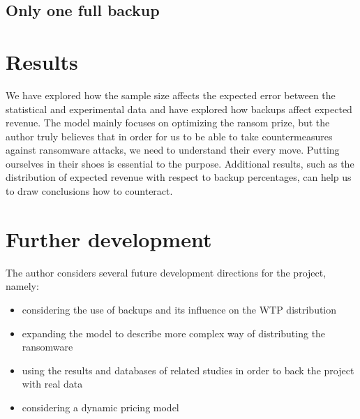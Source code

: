 \documentclass[11pt, a4paper]{article}
\theoremstyle{definition}
\begin{document}
		\subsection{Only one full backup}
			
\section{Results}
	We have explored how the sample size affects the expected error between the statistical and experimental data and have explored how backups affect expected revenue. The model mainly focuses on optimizing the ransom prize, but the author truly believes that in order for us to be able to take countermeasures against ransomware attacks, we need to understand their every move. Putting ourselves in their shoes is essential to the purpose. Additional results, such as the distribution of expected revenue with respect to backup percentages, can help us to draw conclusions how to counteract.
\section{Further development}
	The author considers several future development directions for the project, namely:
	\begin{itemize}
		\item considering the use of backups and its influence on the WTP distribution
		\item expanding the model to describe more complex way of distributing the ransomware
		\item using the results and databases of related studies in order to back the project with real data\cite{paquet2019ransomware}
		\item considering a dynamic pricing model
	\end{itemize}
\end{document}
